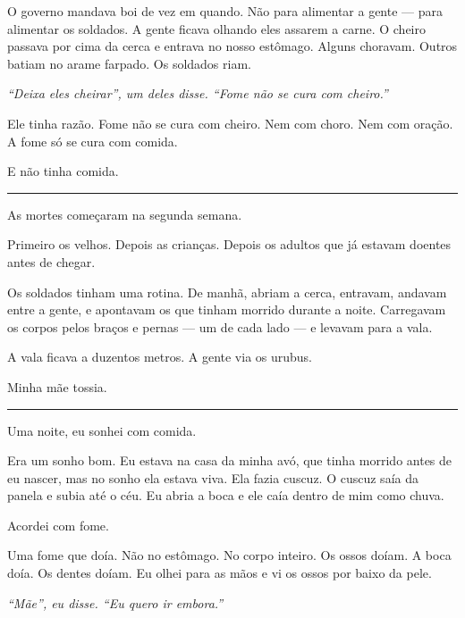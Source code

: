 \noindent O governo mandava boi de vez em quando. Não para alimentar a gente --- para alimentar os soldados. A gente ficava olhando eles assarem a carne. O cheiro passava por cima da cerca e entrava no nosso estômago. Alguns choravam. Outros batiam no arame farpado. Os soldados riam.

\noindent \textit{\textquotedblleft{}Deixa eles cheirar\textquotedblright{}\textit{, um deles disse. }\textquotedblleft{}Fome não se cura com cheiro.\textquotedblright{}}

\noindent Ele tinha razão. Fome não se cura com cheiro. Nem com choro. Nem com oração. A fome só se cura com comida.

\noindent E não tinha comida.

\vspace{0.5em}\noindent\rule{\textwidth}{0.5pt}\vspace{0.5em}

\noindent As mortes começaram na segunda semana.

\noindent Primeiro os velhos. Depois as crianças. Depois os adultos que já estavam doentes antes de chegar.

\noindent Os soldados tinham uma rotina. De manhã, abriam a cerca, entravam, andavam entre a gente, e apontavam os que tinham morrido durante a noite. Carregavam os corpos pelos braços e pernas --- um de cada lado --- e levavam para a vala.

\noindent A vala ficava a duzentos metros. A gente via os urubus.

\noindent Minha mãe tossia.

\vspace{0.5em}\noindent\rule{\textwidth}{0.5pt}\vspace{0.5em}

\noindent Uma noite, eu sonhei com comida.

\noindent Era um sonho bom. Eu estava na casa da minha avó, que tinha morrido antes de eu nascer, mas no sonho ela estava viva. Ela fazia cuscuz. O cuscuz saía da panela e subia até o céu. Eu abria a boca e ele caía dentro de mim como chuva.

\noindent Acordei com fome.

\noindent Uma fome que doía. Não no estômago. No corpo inteiro. Os ossos doíam. A boca doía. Os dentes doíam. Eu olhei para as mãos e vi os ossos por baixo da pele.

\noindent \textit{\textquotedblleft{}Mãe\textquotedblright{}\textit{, eu disse. }\textquotedblleft{}Eu quero ir embora.\textquotedblright{}}

